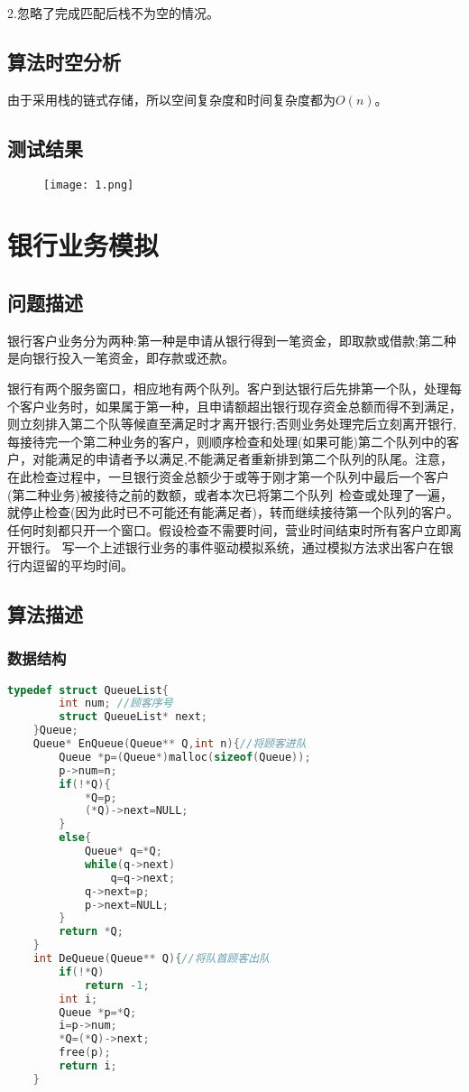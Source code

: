 \documentclass{ctexart}
\begin{document}
	2.忽略了完成匹配后栈不为空的情况。
	\subsection{算法时空分析}
	由于采用栈的链式存储，所以空间复杂度和时间复杂度都为$O(n)$。
	\subsection{测试结果}
	\begin{figure}[H]
		\centering 
		\texttt{[image: 1.png]}
		\end{figure}

\section{银行业务模拟}
	\subsection{问题描述}
	银行客户业务分为两种:第一种是申请从银行得到一笔资金，即取款或借款;第二种是向银行投入一笔资金，即存款或还款。

	银行有两个服务窗口，相应地有两个队列。客户到达银行后先排第一个队，处理每个客户业务时，如果属于第一种，且申请额超出银行现存资金总额而得不到满足，则立刻排入第二个队等候直至满足时才离开银行;否则业务处理完后立刻离开银行,每接待完一个第二种业务的客户，则顺序检查和处理(如果可能)第二个队列中的客户，对能满足的申请者予以满足,不能满足者重新排到第二个队列的队尾。注意，在此检查过程中，一旦银行资金总额少于或等于刚才第一个队列中最后一个客户(第二种业务)被接待之前的数额，或者本次已将第二个队列 检查或处理了一遍，就停止检查(因为此时已不可能还有能满足者)，转而继续接待第一个队列的客户。任何时刻都只开一个窗口。假设检查不需要时间，营业时间结束时所有客户立即离开银行。
	写一个上述银行业务的事件驱动模拟系统，通过模拟方法求出客户在银行内逗留的平均时间。
	\subsection{算法描述}
	\subsubsection{数据结构}
	\begin{lstlisting}[language=C++, caption=链队列基本操作]
	typedef struct QueueList{
		int num; //顾客序号
		struct QueueList* next;
	}Queue;
	Queue* EnQueue(Queue** Q,int n){//将顾客进队
		Queue *p=(Queue*)malloc(sizeof(Queue));
		p->num=n;
		if(!*Q){
			*Q=p;
			(*Q)->next=NULL;
		}
		else{
			Queue* q=*Q;
			while(q->next)
				q=q->next;
			q->next=p;
			p->next=NULL;
		}
		return *Q;
	}
	int DeQueue(Queue** Q){//将队首顾客出队
		if(!*Q)
			return -1;
		int i;
		Queue *p=*Q;
		i=p->num;
		*Q=(*Q)->next;
		free(p);
		return i;
	}
	\end{lstlisting}
\end{document}
